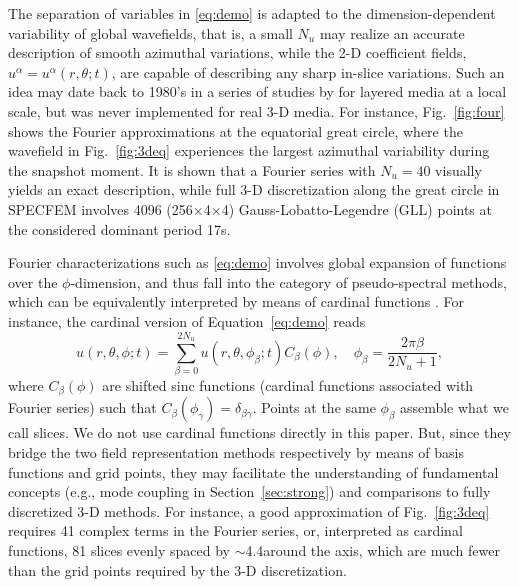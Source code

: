 \documentclass[extra]{gji}
\begin{document}
The separation of variables in \eqref{eq:demo} is 
adapted to the dimension-dependent variability of global wavefields, that is, 
a small $N_u$ may realize an accurate description of smooth azimuthal variations, 
while the 2-D coefficient fields, $u^\alpha=u^\alpha\left(r,\theta;t\right)$, 
are capable of describing any sharp in-slice variations. 
Such an idea may date back to 1980's in a series of studies by 
\cite{alekseev1980solution, mikhailenko1984synthetic,
mikhailenko1984calculation} for layered media at a local scale, but
was never implemented for real 3-D media. 
For instance, Fig.~\ref{fig:four} shows the Fourier approximations at
the equatorial great circle, where the wavefield in Fig.~\ref{fig:3deq} 
experiences the largest azimuthal variability during the snapshot moment. 
It is shown that a Fourier series with $N_u=40$ visually yields
an exact description, while full 3-D discretization along the great circle
in SPECFEM involves 4096 (256$\times$4$\times$4) Gauss-Lobatto-Legendre (GLL) 
points at the considered dominant period 17s. 

Fourier characterizations such as \eqref{eq:demo} involves global expansion of 
functions over the $\phi$-dimension, and thus fall into the category of 
pseudo-spectral methods, which can be equivalently interpreted by means of 
cardinal functions \cite[Chap 5,][]{boyd2001spectral}.
For instance, the cardinal version of Equation~\eqref{eq:demo} reads
\begin{equation}
  u\left(r,\theta,\phi;t\right)=\sum_{\beta=0}^{2N_u} 
  u\left(r,\theta,\phi_\beta;t\right)C_\beta\left(\phi\right),\quad 
  \phi_\beta=\frac{2\pi \beta}{2N_u+1},
  \label{eq:card}
\end{equation}
where $C_\beta\left(\phi\right)$ are shifted sinc functions (cardinal functions
associated with Fourier series) such that 
$C_\beta\left(\phi_\gamma\right)=\delta_{\beta\gamma}$.   
Points at the same $\phi_\beta$ assemble what we call slices. 
We do not use cardinal functions directly in this paper. 
But, since they bridge the two field representation methods respectively  
by means of basis functions and grid points, 
they may facilitate the understanding of fundamental concepts 
(e.g., mode coupling in Section~\ref{sec:strong}) and comparisons
to fully discretized 3-D methods. For instance, a good approximation
of Fig.~\ref{fig:3deq} requires 41 complex terms in the 
Fourier series, or, interpreted as cardinal functions, 
81 slices evenly spaced by $\sim$4.4\degr around the axis, 
which are much fewer than the grid points required by the 
3-D discretization.     
\end{document}
